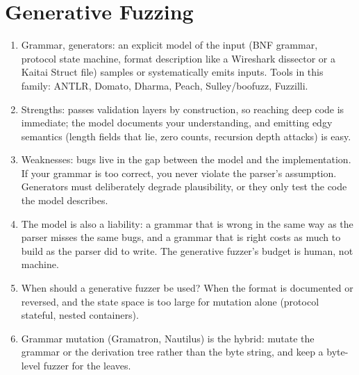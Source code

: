 \documentclass[12pt]{Training}
\begin{document}
\section*{Generative Fuzzing}
\begin{enumerate}
	\item Grammar, generators: an explicit model of the input (BNF grammar, protocol state machine, format description like a Wireshark dissector or a Kaitai Struct file) samples or systematically emits inputs. Tools in this family: ANTLR, Domato, Dharma, Peach, Sulley/boofuzz, Fuzzilli.
	\item Strengths: passes validation layers by construction, so reaching deep code is immediate; the model documents your understanding, and emitting edgy semantics (length fields that lie, zero counts, recursion depth attacks) is easy.
	\item Weaknesses: bugs live in the gap between the model and the implementation. If your grammar is too correct, you never violate the parser's assumption. Generators must deliberately degrade plausibility, or they only test the code the model describes.
	\item The model is also a liability: a grammar that is wrong in the same way as the parser misses the same bugs, and a grammar that is right costs as much to build as the parser did to write. The generative fuzzer's budget is human, not machine.
	\item When should a generative fuzzer be used? When the format is documented or reversed, and the state space is too large for mutation alone (protocol stateful, nested containers).
	\item Grammar mutation (Gramatron, Nautilus) is the hybrid: mutate the grammar or the derivation tree rather than the byte string, and keep a byte-level fuzzer for the leaves.
\end{enumerate}
\end{document}
